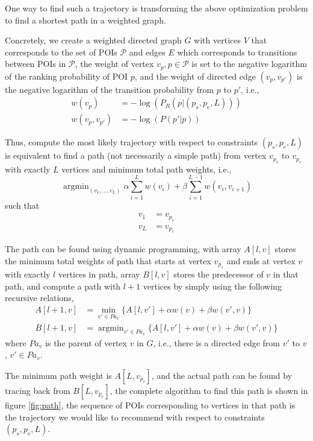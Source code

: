 \documentclass{sig-alternate-05-2015}
\DeclareMathOperator*{\argmin}{argmin}
\begin{document}
One way to find such a trajectory is transforming the above optimization problem to 
find a shortest path in a weighted graph.

Concretely,
we create a weighted directed graph $G$ with vertices $V$ that corresponds to the set of POIs $\mathcal{P}$ and 
edges $E$ which corresponds to transitions between POIs in $\mathcal{P}$,
the weight of vertex $v_{p}, p \in \mathcal{P}$ is set to the negative logarithm of the ranking probability of POI $p$, 
and the weight of directed edge $(v_p, v_{p'})$ is the negative logarithm of the transition probability from $p$ to $p'$,
i.e.,
\begin{align*}
    w(v_{p})       & = -\log(P_R(p | (p_s, p_e, L))) \\
    w(v_p, v_{p'}) & = -\log(P(p' | p))
\end{align*}

Thus, compute the most likely trajectory with respect to constraints $(p_s, p_e, L)$ is
equivalent to find a path (not necessarily a simple path) from vertex $v_{p_s}$ to
$v_{p_e}$ with exactly $L$ vertices and minimum total path weights,
i.e.,
\begin{displaymath}
    \argmin_{(v_1, \dots, v_L)} \alpha \sum_{i=1}^{L} w(v_i) + \beta \sum_{i=1}^{L-1} w(v_i, v_{i+1})
\end{displaymath}
such that
\begin{align*}
    v_1 &= v_{p_s} \\
    v_L &= v_{p_e} 
\end{align*}
    
The path can be found using dynamic programming, 
with array $A[l, v]$ stores the minimum total weights of path 
that starts at vertex $v_{p_s}$ and ends at vertex $v$ with 
exactly $l$ vertices in path,
array $B[l, v]$ stores the predecessor of $v$ in that path,
and compute a path with $l+1$ vertices by simply using the following recursive relations,
\begin{align*}
    A[l+1, v] &= \min_{v' \in Pa_v} \{ A[l, v'] + \alpha w(v) + \beta w(v', v) \} \\
    B[l+1, v] &= \argmin_{v' \in Pa_v} \{ A[l, v'] + \alpha w(v) + \beta w(v', v) \} 
\end{align*}
where $Pa_v$ is the parent of vertex $v$ in $G$,
i.e., 
there is a directed edge from $v'$ to $v$, $v' \in Pa_v$.

The minimum path weight is $A[L, v_{p_e}]$,
and the actual path can be found by tracing back from $B[L, v_{p_e}]$,
the complete algorithm to find this path is shown in figure \ref{fig:path},
the sequence of POIs corresponding to vertices in that path is the 
trajectory we would like to recommend with respect to constraints $(p_s, p_e, L)$.
\end{document}
